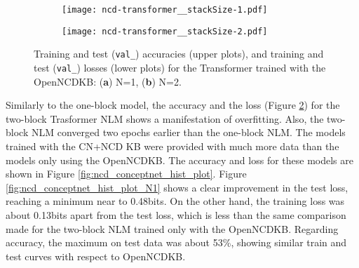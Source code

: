 \documentclass[preprint]{elsarticle}
\begin{document}
\begin{figure}[htb]
	\centering
	\hspace*{\fill}
	\begin{subfigure}[b]{.48\linewidth}
		\centering
		\texttt{[image: ncd-transformer\_\_stackSize-1.pdf]}
		\captionsetup{justification=centering}
		\caption{}
         \label{fig:ncd_hist_plot_N1}
	\end{subfigure}
	\hspace*{\fill}
	\begin{subfigure}[b]{.48\linewidth}
		\centering
		\texttt{[image: ncd-transformer\_\_stackSize-2.pdf]}
		\captionsetup{justification=centering}
		\caption{}
         \label{fig:ncd_hist_plot_N2}
	\end{subfigure}
	\hspace*{\fill}
	\caption{Training and test (\texttt{val\_}) accuracies (upper plots), and training and test (\texttt{val\_}) losses (lower plots) for the Transformer trained with the OpenNCDKB: (\textbf{a}) N=1, (\textbf{b}) N=2.}
	\label{fig:ncd_hist_plot}
\end{figure}
Similarly to the one-block model, the accuracy and the loss (Figure \ref{fig:ncd_hist_plot_N2}) for the two-block Trasformer NLM shows a manifestation of overfitting. Also, the two-block NLM converged two epochs earlier than the one-block NLM.
The models trained with the CN+NCD KB were provided with much more data than the models only using the OpenNCDKB. The accuracy and loss for these models are shown in Figure \ref{fig:ncd_conceptnet_hist_plot}. Figure \ref{fig:ncd_conceptnet_hist_plot_N1} shows a clear improvement in the test loss, reaching a minimum near to 0.48bits. On the other hand, the training loss was about 0.13bits apart from the test loss, which is less than the same comparison made for the two-block NLM trained only with the OpenNCDKB. Regarding accuracy, the maximum on test data was about 53\%, showing similar train and test curves with respect to OpenNCDKB.
\end{document}
